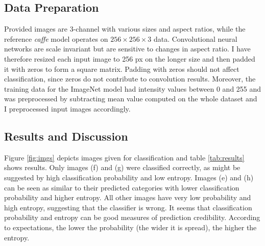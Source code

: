 \documentclass[journal, a4paper]{IEEEtran}
\begin{document}
  \subsection{Data Preparation}
    Provided images are 3-channel with various sizes and aspect ratios, while the reference \textit{caffe} model operates on $256\times 256\times 3$ data. Convolutional neural networks are scale invariant but are sensitive to changes in aspect ratio. I have therefore resized each input image to 256 px on the longer size and then padded it with zeros to form a square matrix. Padding with zeros should not affect classification, since zeros do not contribute to convolution results. Moreover, the training data for the ImageNet model had intensity values between 0 and 255 and was preprocessed by subtracting mean value computed on the whole dataset and I preprocessed input images accordingly.
    
  \subsection{Results and Discussion}
    Figure \ref{fig:imgs} depicts images given for classification and table \ref{tab:results} shows results. Only images (f) and (g) were classified correctly, as might be suggested by high classification probability and low entropy. Images (e) and (h) can be seen as similar to their predicted categories with lower classification probability and higher entropy. All other images have very low probability and high entropy, suggesting that the classifier is wrong. It seems that classification probability and entropy can be good measures of prediction credibility. According to expectations, the lower the probability (the wider it is spread), the higher the entropy.
\end{document}
